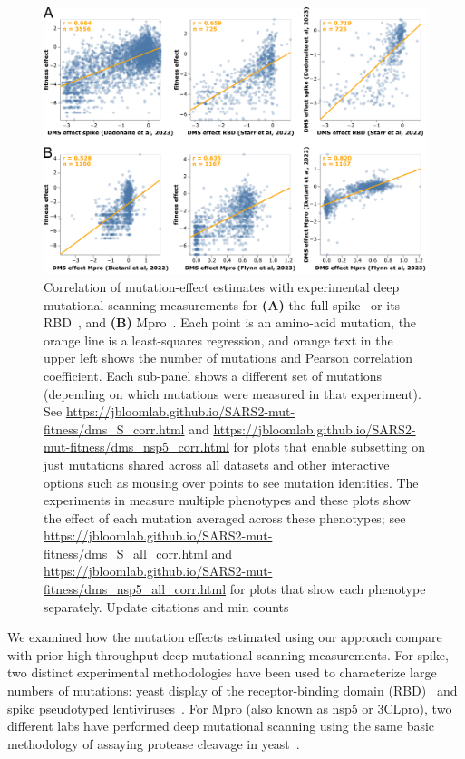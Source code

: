 \documentclass[9pt,twocolumn,twoside]{gsajnl_modified}
\begin{document}
\begin{figure}
\centering
\includegraphics[width=0.7\linewidth]{figs/dms.png}
\caption{
Correlation of mutation-effect estimates with experimental deep mutational scanning measurements for {\bf (A)} the full spike~\citep{dadonaite2022pseudovirus} or its RBD~\citep{starr2022deep}, and {\bf (B)} Mpro~\citep{flynn2022,iketani2022functional}.
Each point is an amino-acid mutation, the orange line is a least-squares regression, and orange text in the upper left shows the number of mutations and Pearson correlation coefficient.
Each sub-panel shows a different set of mutations (depending on which mutations were measured in that experiment).
See \url{https://jbloomlab.github.io/SARS2-mut-fitness/dms_S_corr.html} and \url{https://jbloomlab.github.io/SARS2-mut-fitness/dms_nsp5_corr.html} for plots that enable subsetting on just mutations shared across all datasets and other interactive options such as mousing over points to see mutation identities.
The experiments in \cite{starr2022deep, flynn2022} measure multiple phenotypes and these plots show the effect of each mutation averaged across these phenotypes; see \url{https://jbloomlab.github.io/SARS2-mut-fitness/dms_S_all_corr.html} and \url{https://jbloomlab.github.io/SARS2-mut-fitness/dms_nsp5_all_corr.html} for plots that show each phenotype separately.
{\color{red} Update citations and min counts}
\label{fig:dms}
}
\end{figure}

We examined how the mutation effects estimated using our approach compare with prior high-throughput deep mutational scanning measurements.
For spike, two distinct experimental methodologies have been used to characterize large numbers of mutations: yeast display of the receptor-binding domain (RBD)~\citep{starr2020deep,starr2022deep} and spike pseudotyped lentiviruses~\citep{dadonaite2022pseudovirus}.
For Mpro (also known as nsp5 or 3CLpro), two different labs have performed deep mutational scanning using the same basic methodology of assaying protease cleavage in yeast~\citep{flynn2022,iketani2022functional}.
\end{document}
